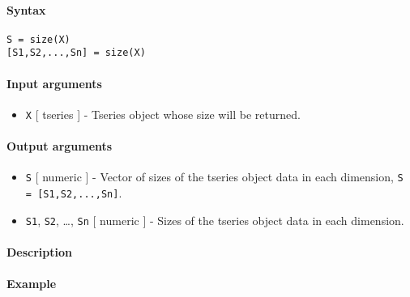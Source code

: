 


	\paragraph{Syntax}

\begin{verbatim}
S = size(X)
[S1,S2,...,Sn] = size(X)
\end{verbatim}

\paragraph{Input arguments}

\begin{itemize}
\itemsep1pt\parskip0pt
\item
  \texttt{X} {[} tseries {]} - Tseries object whose size will be
  returned.
\end{itemize}

\paragraph{Output arguments}

\begin{itemize}
\item
  \texttt{S} {[} numeric {]} - Vector of sizes of the tseries object
  data in each dimension, \texttt{S = {[}S1,S2,...,Sn{]}}.
\item
  \texttt{S1}, \texttt{S2}, \ldots{}, \texttt{Sn} {[} numeric {]} -
  Sizes of the tseries object data in each dimension.
\end{itemize}

\paragraph{Description}

\paragraph{Example}


